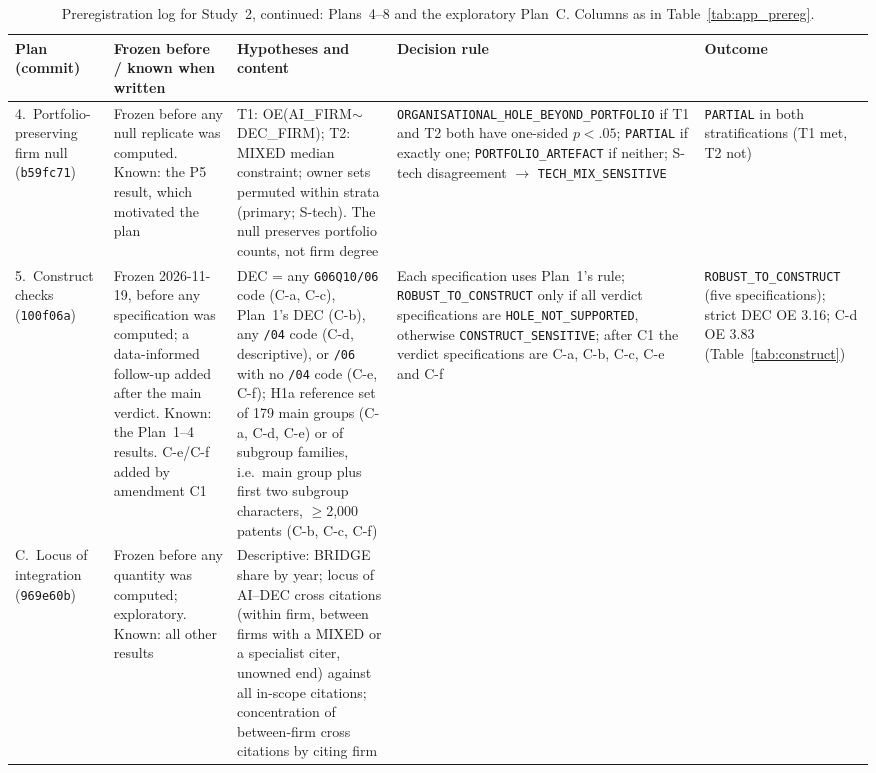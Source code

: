 \begin{table}[tbp]
\centering
\caption{Preregistration log for Study~2, continued: Plans~4--8 and the exploratory Plan~C. Columns as in Table~\ref{tab:app_prereg}.}
\label{tab:app_prereg_b}
\footnotesize
\setlength{\tabcolsep}{4pt}
\begin{tabular}{p{2.0cm}p{2.5cm}p{3.7cm}p{4.3cm}p{2.3cm}}
\toprule
Plan (commit) & Frozen before / known when written & Hypotheses and content & Decision rule & Outcome \tabularnewline
\midrule
\raggedright 4.~Portfolio-preserving firm null (\texttt{b59fc71}) &
\raggedright Frozen before any null replicate was computed. Known: the P5 result, which motivated the plan &
\raggedright T1: OE(AI\_FIRM$\sim$DEC\_FIRM); T2: MIXED median constraint; owner sets permuted within strata (primary; S-tech). The null preserves portfolio counts, not firm degree &
\raggedright \texttt{ORGANISATIONAL\_\allowbreak HOLE\_\allowbreak BEYOND\_\allowbreak PORTFOLIO} if T1 and T2 both have one-sided $p<.05$; \texttt{PARTIAL} if exactly one; \texttt{PORTFOLIO\_\allowbreak ARTEFACT} if neither; S-tech disagreement $\rightarrow$ \texttt{TECH\_\allowbreak MIX\_\allowbreak SENSITIVE} &
\raggedright \texttt{PARTIAL} in both stratifications (T1 met, T2 not) \tabularnewline
\addlinespace
\raggedright 5.~Construct checks (\texttt{100f06a}) &
\raggedright Frozen 2026-11-19, before any specification was computed; a data-informed follow-up added after the main verdict. Known: the Plan~1--4 results. C-e/C-f added by amendment C1 &
\raggedright DEC = any \texttt{G06Q10/06} code (C-a, C-c), Plan~1's DEC (C-b), any \texttt{/04} code (C-d, descriptive), or \texttt{/06} with no \texttt{/04} code (C-e, C-f); H1a reference set of 179 main groups (C-a, C-d, C-e) or of subgroup families, i.e.\ main group plus first two subgroup characters, $\geq$2,000 patents (C-b, C-c, C-f) &
\raggedright Each specification uses Plan~1's rule; \texttt{ROBUST\_\allowbreak TO\_\allowbreak CONSTRUCT} only if all verdict specifications are \texttt{HOLE\_\allowbreak NOT\_\allowbreak SUPPORTED}, otherwise \texttt{CONSTRUCT\_\allowbreak SENSITIVE}; after C1 the verdict specifications are C-a, C-b, C-c, C-e and C-f &
\raggedright \texttt{ROBUST\_\allowbreak TO\_\allowbreak CONSTRUCT} (five specifications); strict DEC OE 3.16; C-d OE 3.83 (Table~\ref{tab:construct}) \tabularnewline
\addlinespace
\raggedright C.~Locus of integration (\texttt{969e60b}) &
\raggedright Frozen before any quantity was computed; exploratory. Known: all other results &
\raggedright Descriptive: BRIDGE share by year; locus of AI--DEC cross citations (within firm, between firms with a MIXED or a specialist citer, unowned end) against all in-scope citations; concentration of between-firm cross citations by citing firm &

\end{tabular}
\end{table}
